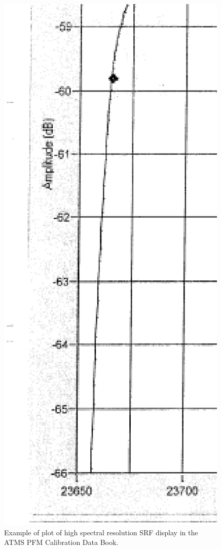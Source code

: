 \begin{figure}[H]
  \centering
  \includegraphics[bb=368 260 1540 1062,scale=0.25]{graphics/srf/Rset/ch1.REShi.eps}
  \caption{Example of plot of high spectral resolution SRF display in the ATMS PFM Calibration Data Book\cite{ATMS_PFM_CalLog}.}
  \label{fig:ch1.REShi}
\end{figure}

